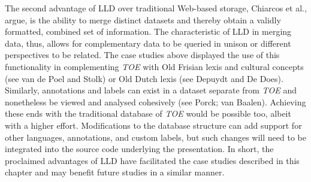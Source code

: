 The second advantage of LLD over traditional Web-based storage, Chiarcos et al., argue, is the ability to merge distinct datasets and thereby obtain a validly formatted, combined set of information. The characteristic of LLD in merging data, thus, allows for complementary data to be queried in unison or different perspectives to be related. The case studies above displayed the use of this functionality in complementing \textit{TOE} with Old Frisian lexis and cultural concepts (see van de Poel and Stolk) or Old Dutch lexis (see Depuydt and De Does). Similarly, annotations and labels can exist in a dataset separate from \textit{TOE} and nonetheless be viewed and analysed cohesively (see Porck; van Baalen). Achieving these ends with the traditional database of \textit{TOE} would be possible too, albeit with a higher effort. Modifications to the database structure can add support for other languages, annotations, and custom labels, but such changes will need to be %
integrated into the source code underlying the presentation. 
In short, the proclaimed advantages of LLD have facilitated the case studies described in this chapter and may benefit future studies in a similar manner. 





